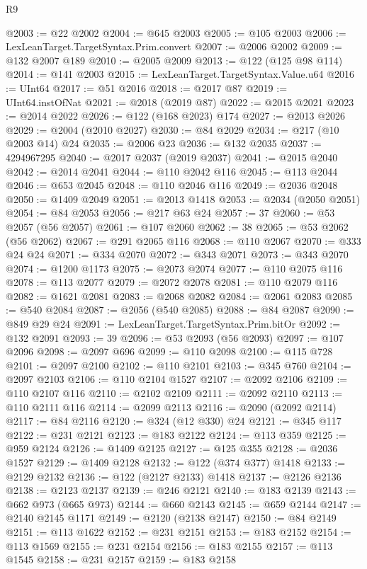 \begin{lexlean}{R9}
\begin{coremodule}
@2003 := @22 @2002
@2004 := @645 @2003
@2005 := @105 @2003
@2006 := LexLeanTarget.TargetSyntax.Prim.convert
@2007 := @2006 @2002
@2009 := @132 @2007 @189
@2010 := @2005 @2009
@2013 := @122 (@125 @98 @114)
@2014 := @141 @2003
@2015 := LexLeanTarget.TargetSyntax.Value.u64
@2016 := UInt64
@2017 := @51 @2016
@2018 := @2017 @87
@2019 := UInt64.instOfNat
@2021 := @2018 (@2019 @87)
@2022 := @2015 @2021
@2023 := @2014 @2022
@2026 := @122 (@168 @2023) @174
@2027 := @2013 @2026
@2029 := @2004 (@2010 @2027)
@2030 := @84 @2029
@2034 := @217 (@10 @2003 @14) @24
@2035 := @2006 @23
@2036 := @132 @2035
@2037 := 4294967295
@2040 := @2017 @2037 (@2019 @2037)
@2041 := @2015 @2040
@2042 := @2014 @2041
@2044 := @110 @2042 @116
@2045 := @113 @2044
@2046 := @653 @2045
@2048 := @110 @2046 @116
@2049 := @2036 @2048
@2050 := @1409 @2049
@2051 := @2013 @1418
@2053 := @2034 (@2050 @2051)
@2054 := @84 @2053
@2056 := @217 @63 @24
@2057 := 37
@2060 := @53 @2057 (@56 @2057)
@2061 := @107 @2060
@2062 := 38
@2065 := @53 @2062 (@56 @2062)
@2067 := @291 @2065 @116
@2068 := @110 @2067
@2070 := @333 @24 @24
@2071 := @334 @2070
@2072 := @343 @2071
@2073 := @343 @2070
@2074 := @1200 @1173
@2075 := @2073 @2074
@2077 := @110 @2075 @116
@2078 := @113 @2077
@2079 := @2072 @2078
@2081 := @110 @2079 @116
@2082 := @1621 @2081
@2083 := @2068 @2082
@2084 := @2061 @2083
@2085 := @540 @2084
@2087 := @2056 (@540 @2085)
@2088 := @84 @2087
@2090 := @849 @29 @24
@2091 := LexLeanTarget.TargetSyntax.Prim.bitOr
@2092 := @132 @2091
@2093 := 39
@2096 := @53 @2093 (@56 @2093)
@2097 := @107 @2096
@2098 := @2097 @696
@2099 := @110 @2098
@2100 := @115 @728
@2101 := @2097 @2100
@2102 := @110 @2101
@2103 := @345 @760
@2104 := @2097 @2103
@2106 := @110 @2104 @1527
@2107 := @2092 @2106
@2109 := @110 @2107 @116
@2110 := @2102 @2109
@2111 := @2092 @2110
@2113 := @110 @2111 @116
@2114 := @2099 @2113
@2116 := @2090 (@2092 @2114)
@2117 := @84 @2116
@2120 := @324 (@12 @330) @24
@2121 := @345 @117
@2122 := @231 @2121
@2123 := @183 @2122
@2124 := @113 @359
@2125 := @959 @2124
@2126 := @1409 @2125
@2127 := @125 @355
@2128 := @2036 @1527
@2129 := @1409 @2128
@2132 := @122 (@374 @377) @1418
@2133 := @2129 @2132
@2136 := @122 (@2127 @2133) @1418
@2137 := @2126 @2136
@2138 := @2123 @2137
@2139 := @246 @2121
@2140 := @183 @2139
@2143 := @662 @973 (@665 @973)
@2144 := @660 @2143
@2145 := @659 @2144
@2147 := @2140 @2145 @1171
@2149 := @2120 (@2138 @2147)
@2150 := @84 @2149
@2151 := @113 @1622
@2152 := @231 @2151
@2153 := @183 @2152
@2154 := @113 @1569
@2155 := @231 @2154
@2156 := @183 @2155
@2157 := @113 @1545
@2158 := @231 @2157
@2159 := @183 @2158

\end{coremodule}
\end{lexlean}
